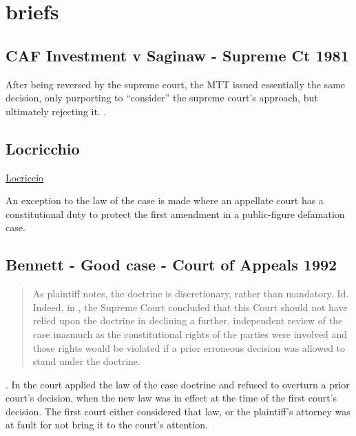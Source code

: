 \documentclass[12pt,\documentclassflag]{michiganCourtOfAppealsBrief}
\begin{document}
\section{briefs}

\subsection{CAF Investment v Saginaw - Supreme Ct 1981}

After being reversed by the supreme court, the MTT issued essentially the same decision, only purporting to ``consider'' the supreme court's approach, but ultimately rejecting it. 
\href{https://scholar.google.com/scholar_case?case=1859820490408132760&q=%22law+of+the+case%22&hl=en&as_sdt=4,23}{\cite{CAF v Saginaw}}.

 
\subsection{Locricchio}

\href{https://scholar.google.com/scholar_case?case=7419209027640476971&q=%22law+of+the+case%22&hl=en&as_sdt=4,23}{Locriccio}
  
An exception to the law of the case is made where an appellate court has a constitutional duty to protect the first amendment in a public-figure defamation case.

\subsection{Bennett - Good case - Court of Appeals 1992 }

\begin{quote}
  As plaintiff notes, the doctrine is discretionary, rather than mandatory. Id. Indeed, in \cite{Locricchio}, the Supreme Court concluded that this Court should not have relied upon the doctrine in declining a further, independent review of the case inasmuch as the constitutional rights of the parties were involved and those rights would be violated if a prior erroneous decision was allowed to stand under the doctrine.
\end{quote}

.
In
\href{https://scholar.google.com/scholar_case?case=9666857530417784922&q=%22law+of+the+case%22&hl=en&as_sdt=4,23}{\cite{Bennett}}
the court applied the law of the case doctrine and refused to overturn a prior court's decision, when the new law was in effect at the time of the first court's decision. The first court either considered that law, or the plaintiff's  attorney was at fault for not bring it to the court's attention.
\end{document}
